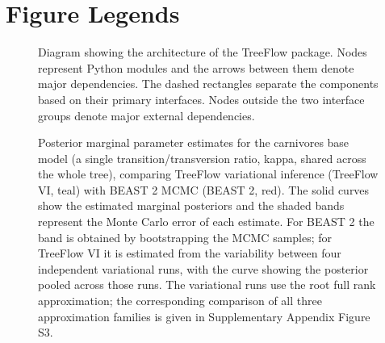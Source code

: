 \documentclass[oupdraft]{sysbio_sse}
\begin{document}

\bigskip\bigskip





\clearpage

\section*{Figure Legends}

\begin{figure}[!ht]
    \caption{Diagram showing the architecture of the TreeFlow package. Nodes represent Python modules and the arrows between them denote major dependencies. The dashed rectangles separate the components based on their primary interfaces. Nodes outside the two interface groups denote major external dependencies.}
    \label{fig:architecture}
\end{figure}

\begin{figure}[!ht]
    \caption{Posterior marginal parameter estimates for the carnivores base model (a single transition/transversion ratio, kappa, shared across the whole tree), comparing TreeFlow variational inference (TreeFlow VI, teal) with BEAST 2 MCMC (BEAST 2, red). The solid curves show the estimated marginal posteriors and the shaded bands represent the Monte Carlo error of each estimate. For BEAST 2 the band is obtained by bootstrapping the MCMC samples; for TreeFlow VI it is estimated from the variability between four independent variational runs, with the curve showing the posterior pooled across those runs. The variational runs use the root full rank approximation; the corresponding comparison of all three approximation families is given in Supplementary Appendix Figure S3.}
    \label{fig:carnivoresmarginals}
\end{figure}
\end{document}
